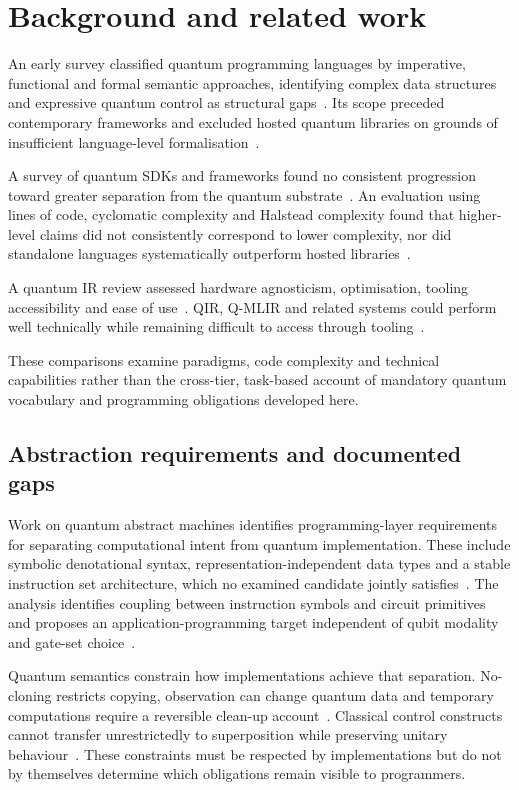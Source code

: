 \section{Background and related work}\label{sec:background}
An early survey classified quantum programming languages by imperative, functional and formal semantic approaches, identifying complex data structures and expressive quantum control as structural gaps~\cite{Gay2006QPLSurvey}.
Its scope preceded contemporary frameworks and excluded hosted quantum libraries on grounds of insufficient language-level formalisation~\cite{Gay2006QPLSurvey}.

A survey of quantum SDKs and frameworks found no consistent progression toward greater separation from the quantum substrate~\cite{furntratt2024higherabstractionlevels}.
An evaluation using lines of code, cyclomatic complexity and Halstead complexity found that higher-level claims did not consistently correspond to lower complexity, nor did standalone languages systematically outperform hosted libraries~\cite{corralesgarro2025productivityexpressiveness}.

A quantum IR review assessed hardware agnosticism, optimisation, tooling accessibility and ease of use~\cite{irreview2024}.
QIR, Q-MLIR and related systems could perform well technically while remaining difficult to access through tooling~\cite{irreview2024}.

These comparisons examine paradigms, code complexity and technical capabilities rather than the cross-tier, task-based account of mandatory quantum vocabulary and programming obligations developed here.

\subsection{Abstraction requirements and documented gaps}\label{subsec:background:abstraction}
Work on quantum abstract machines identifies programming-layer requirements for separating computational intent from quantum implementation.
These include symbolic denotational syntax, representation-independent data types and a stable instruction set architecture, which no examined candidate jointly satisfies~\cite{nunez_corrales2025betterabstractmachines}.
The analysis identifies coupling between instruction symbols and circuit primitives and proposes an application-programming target independent of qubit modality and gate-set choice~\cite{nunez_corrales2025betterabstractmachines}.

Quantum semantics constrain how implementations achieve that separation.
No-cloning restricts copying, observation can change quantum data and temporary computations require a reversible clean-up account~\cite{yuan2025foundationalabstractions}.
Classical control constructs cannot transfer unrestrictedly to superposition while preserving unitary behaviour~\cite{yuan2025foundationalabstractions}.
These constraints must be respected by implementations but do not by themselves determine which obligations remain visible to programmers.

